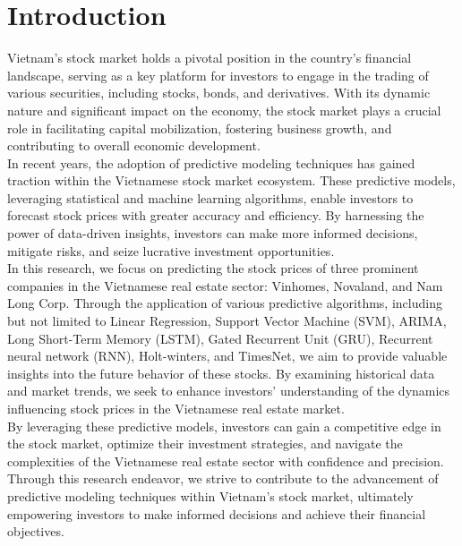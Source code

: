 \documentclass{ieeeojies}
\begin{document}
\section{Introduction}
Vietnam's stock market holds a pivotal position in the country's financial landscape, serving as a key platform for investors to engage in the trading of various securities, including stocks, bonds, and derivatives. With its dynamic nature and significant impact on the economy, the stock market plays a crucial role in facilitating capital mobilization, fostering business growth, and contributing to overall economic development.\\
In recent years, the adoption of predictive modeling techniques has gained traction within the Vietnamese stock market ecosystem. These predictive models, leveraging statistical and machine learning algorithms, enable investors to forecast stock prices with greater accuracy and efficiency. By harnessing the power of data-driven insights, investors can make more informed decisions, mitigate risks, and seize lucrative investment opportunities.\\
In this research, we focus on predicting the stock prices of three prominent companies in the Vietnamese real estate sector: Vinhomes, Novaland, and Nam Long Corp. Through the application of various predictive algorithms, including but not limited to Linear Regression, Support Vector Machine (SVM), ARIMA, Long Short-Term Memory (LSTM), Gated Recurrent Unit (GRU), Recurrent neural network (RNN), Holt-winters, and TimesNet, we aim to provide valuable insights into the future behavior of these stocks. By examining historical data and market trends, we seek to enhance investors' understanding of the dynamics influencing stock prices in the Vietnamese real estate market.\\
By leveraging these predictive models, investors can gain a competitive edge in the stock market, optimize their investment strategies, and navigate the complexities of the Vietnamese real estate sector with confidence and precision. Through this research endeavor, we strive to contribute to the advancement of predictive modeling techniques within Vietnam's stock market, ultimately empowering investors to make informed decisions and achieve their financial objectives. 
\end{document}
